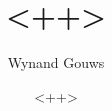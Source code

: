 \documentclass[a4paper, 11pt]{article}
\author{Wynand Gouws}
\title{<++>}
\date{<++>}
\begin{document}
\maketitle



\printbibliography{}
\end{document}
